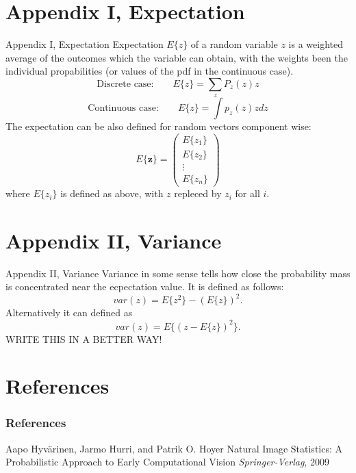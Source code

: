 \documentclass{beamer}
\begin{document}
\section{Appendix I, Expectation}

\begin{frame}{Appendix I, Expectation}
  Expectation $E\{z\}$ of a random variable $z$ is a weighted average of the
  outcomes which the variable can obtain, with the weights been the individual
  propabilities (or values of the pdf in the continuous case).
  \[
  \text{Discrete case:} \qquad
  E\{z\} = \sum_{z} P_{z}(z)z
  \]
  \[
  \text{Continuous case:} \qquad
  E\{z\} = \int p_{z}(z)zdz
  \]
  The expectation can be also defined for random vectors component wise:
  \[
  E\{\mathbf{z}\} =
  \begin{pmatrix} E\{z_1\} \\ E\{z_2\} \\ \vdots \\ E\{z_n\} \end{pmatrix}
  \]
  where $E\{z_i\}$ is defined as above, with $z$ repleced by $z_i$ for all $i$.
\end{frame}

\section{Appendix II, Variance}

\begin{frame}{Appendix II, Variance}
  Variance in some sense tells how close the probability mass is concentrated
  near the ecpectation value. It is defined as follows:
  \[
  var(z)= E\{z^2\}-(E\{z\})^2.
  \]
  Alternatively it can defined as
  \[
   var(z) = E\{(z-E\{z\})^2\}.
  \]
  WRITE THIS IN A BETTER WAY!

\end{frame}

\section{References}

\begin{frame}
\frametitle{References}
\footnotesize{
\begin{thebibliography}{09}
 Aapo Hyvärinen, Jarmo Hurri, and Patrik O. Hoyer
\newblock Natural Image Statistics: A Probabilistic Approach to Early Computational Vision
\newblock \emph{Springer-Verlag}, 2009
\end{thebibliography}
}
\end{frame}
\end{document}

